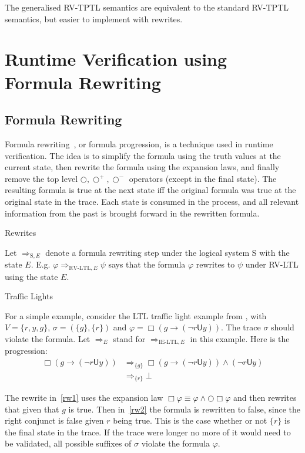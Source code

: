 \documentclass[a4paper]{article}
\newcommand{\U}{\mathsf{U}}
\newcommand{\sn}{\bigcirc^+}
\newcommand{\wn}{\bigcirc^-}
\newcommand{\rw}[1]{\Rightarrow_{#1}}
\begin{document}
The generalised RV-TPTL semantics are equivalent to the standard RV-TPTL semantics, but easier to implement with rewrites. %

\section{Runtime Verification using Formula Rewriting}
\subsection{Formula Rewriting}
Formula rewriting~\autocite{rosu2005rewriting}, or formula progression, is a technique used in runtime verification.
The idea is to simplify the formula using the truth values at the current state, then rewrite the formula using the expansion laws, and finally remove the top level $\bigcirc,\sn,\wn$ operators (except in the final state). The resulting formula is true at the next state iff the original formula was true at the original state in the trace.
Each state is consumed in the process, and all relevant information from the past is brought forward in the rewritten formula.

\begin{notn}{Rewrites}

  Let $\rw{\text{S},E}$ denote a formula rewriting step under the logical system S with the state $E$. E.g. $\varphi\rw{\text{RV-LTL},E}\psi$ says that the formula $\varphi$ rewrites to $\psi$ under RV-LTL using the state $E$.
\end{notn}

\begin{eg}{Traffic Lights}

  For a simple example, consider the LTL traffic light example from \textcite[175]{rosu2005rewriting}, with $V=\{r,y,g\}$, $\sigma = (\{g\},\{r\})$ and $\varphi = \Box (g \to (\neg r \U y))$. The trace $\sigma$ should violate the formula. Let $\rw{E}$ stand for $\rw{\text{IE-LTL},E}$ in this example. Here is the progression:
\begin{align}
  \Box (g \to (\neg r \U y)) &\rw{\{g\}} \Box (g \to (\neg r \U y)) \land (\neg r \U y)\label{rw1}\\
  &\rw{\{r\}} \bot\label{rw2}
\end{align}

The rewrite in~\eqref{rw1} uses the expansion law $\Box \varphi \equiv \varphi \land \bigcirc \Box \varphi$ and then rewrites that given that $g$ is true.
Then in~\eqref{rw2} the formula is rewritten to false, since the right conjunct is false given $r$ being true. This is the case whether or not $\{r\}$ is the final state in the trace. If the trace were longer no more of it would need to be validated, all possible suffixes of $\sigma$ violate the formula $\varphi$.
\end{eg}
\end{document}

